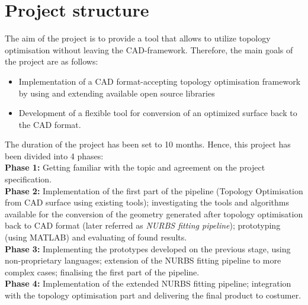 \section{Project structure}
The aim of the project is to provide a tool that allows to utilize topology optimisation without leaving the CAD-framework. Therefore, the main goals of the project are as follows:
\begin{itemize}
\item Implementation of a CAD format-accepting topology optimisation framework by using and extending available open source libraries
\item Development of a flexible tool for conversion of an optimized surface back to the CAD format.
\end{itemize}

The duration of the project has been set to 10 months. Hence, this project has been divided into 4 phases:\\

\textbf{Phase 1:} Getting familiar with the topic and agreement on the project specification.\\

\textbf{Phase 2:} Implementation of the first part of the pipeline (Topology Optimisation from CAD surface using existing tools); investigating the tools and algorithms available for the conversion of the geometry generated after topology optimisation back to CAD format (later referred as \emph{NURBS fitting pipeline}); prototyping (using MATLAB) and evaluating of found results.\\

\textbf{Phase 3:} Implementing the prototypes developed on the previous stage, using non-proprietary languages; extension of the NURBS fitting pipeline to more complex cases; finalising the first part of the pipeline.\\

\textbf{Phase 4:} Implementation of the extended NURBS fitting pipeline; integration with the topology optimisation part and delivering the final product to costumer.
